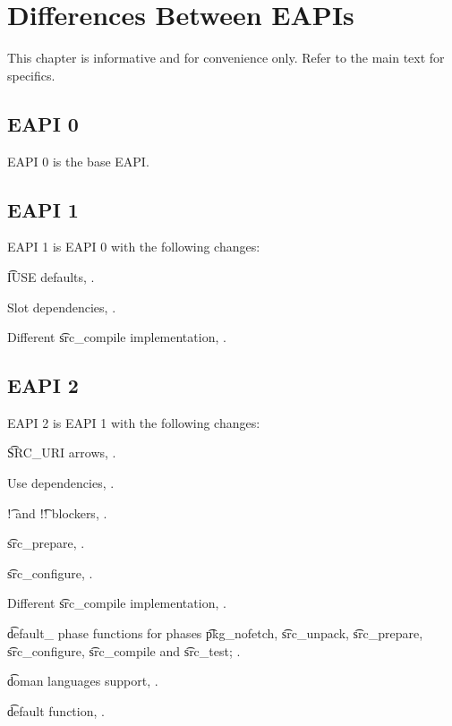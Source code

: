 \chapter{Differences Between EAPIs}

\note This chapter is informative and for convenience only. Refer to the main text for specifics.

\section*{EAPI 0}

EAPI 0 is the base EAPI.

\section*{EAPI 1}

EAPI 1 is EAPI 0 with the following changes:

\begin{compactitem}
\item \t{IUSE} defaults, .
\item Slot dependencies, .
\item Different \t{src\_compile} implementation, .
\end{compactitem}

\section*{EAPI 2}

EAPI 2 is EAPI 1 with the following changes:

\begin{compactitem}
\item \t{SRC\_URI} arrows, .
\item Use dependencies, .
\item \t{!} and \t{!!} blockers, .
\item \t{src\_prepare}, .
\item \t{src\_configure}, .
\item Different \t{src\_compile} implementation, .
\item \t{default\_} phase functions for phases \t{pkg\_nofetch}, \t{src\_unpack}, \t{src\_prepare},
    \t{src\_configure}, \t{src\_compile} and \t{src\_test}; .
\item \t{doman} languages support, .
\item \t{default} function, .
\end{compactitem}

